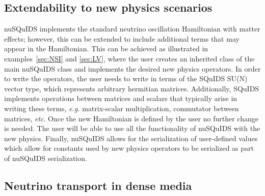 \documentclass[3p,12pt]{elsarticle}
\newcommand{\ttf}{\ttfamily}
\begin{document}
\subsection{Extendability to new physics scenarios}

{\ttf nuSQuIDS} implements the standard neutrino oscillation Hamiltonian with matter effects;
however, this can be extended to include additional terms that may appear in the Hamiltonian.
This can be achieved as illustrated in examples~\ref{sec:NSI} and \ref{sec:LV}, where the user creates an inherited class of the main {\ttf nuSQuIDS} class and implements
the desired new physics operators.
In order to write the operators, the user needs to write in terms of the {\ttf SQuIDS} SU(N) vector type, which represents arbitrary hermitian matrices.
Additionally, {\ttf SQuIDS} implements operations between matrices and scalars that typically arise in writing these terms,
\textit{e.g.} matrix-scalar multiplication, commutator between matrices, \textit{etc}.
Once the new Hamiltonian is defined by the user no further change is needed. The user will be able to use all the functionality
of {\ttf nuSQuIDS} with the new physics.
Finally, {\ttf nuSQuIDS} allows for the serialization of user-defined values which allow for constants used by new physics operators to be serialized as
part of {\ttf nuSQuIDS} serialization.

\subsection{Neutrino transport in dense media}
\end{document}
